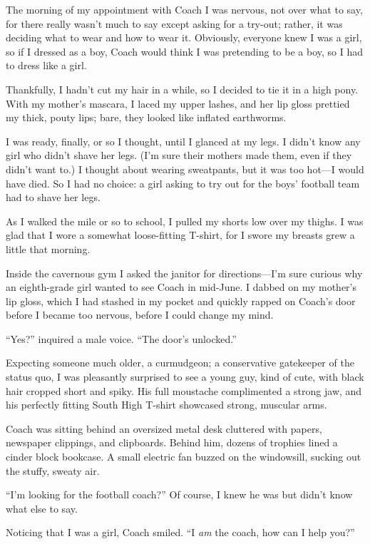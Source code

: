 The morning of my appointment with Coach I was nervous, not over what to
say, for there really wasn't much to say except asking for a try-out;
rather, it was deciding what to wear and how to wear it. Obviously,
everyone knew I was a girl, so if I dressed as a boy, Coach would think
I was pretending to be a boy, so I had to dress like a girl.

Thankfully, I hadn't cut my hair in a while, so I decided to tie it in a
high pony. With my mother's mascara, I laced my upper lashes, and her
lip gloss prettied my thick, pouty lips; bare, they looked like inflated
earthworms.

I was ready, finally, or so I thought, until I glanced at my legs. I
didn't know any girl who didn't shave her legs. (I'm sure their mothers
made them, even if they didn't want to.) I thought about wearing
sweatpants, but it was too hot---I would have died. So I had no choice:
a girl asking to try out for the boys' football team had to shave her
legs.

As I walked the mile or so to school, I pulled my shorts low over my
thighs. I was glad that I wore a somewhat loose-fitting T-shirt, for I
swore my breasts grew a little that morning.

Inside the cavernous gym I asked the janitor for directions---I'm sure
curious why an eighth-grade girl wanted to see Coach in mid-June. I
dabbed on my mother's lip gloss, which I had stashed in my pocket and
quickly rapped on Coach's door before I became too nervous, before I
could change my mind.

``Yes?'' inquired a male voice. ``The door's unlocked.''

Expecting someone much older, a curmudgeon; a conservative gatekeeper of
the status quo, I was pleasantly surprised to see a young guy, kind of
cute, with black hair cropped short and spiky. His full moustache
complimented a strong jaw, and his perfectly fitting South High T-shirt
showcased strong, muscular arms.

Coach was sitting behind an oversized metal desk cluttered with papers,
newspaper clippings, and clipboards. Behind him, dozens of trophies
lined a cinder block bookcase. A small electric fan buzzed on the
windowsill, sucking out the stuffy, sweaty air.

``I'm looking for the football coach?'' Of course, I knew he was but
didn't know what else to say.

Noticing that I was a girl, Coach smiled. ``I \emph{am} the coach, how
can I help you?''

